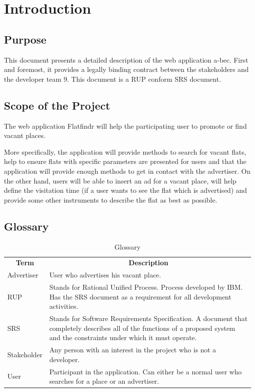 \section{Introduction}

\subsection{Purpose}
This document presents a detailed description of the web application a-bec.
First and foremost, it provides a legally binding contract between the
stakeholders and the developer team 9. This document is a RUP conform SRS document.

\subsection{Scope of the Project}
The web application Flatfindr will help the participating user to promote or
find vacant places.

More specifically, the application will provide methods to search for vacant
flats, help to ensure flats with specific parameters are presented for users and
that the application will provide enough methods to get in contact with the
advertiser. On the other hand, users will be able to insert an ad for a vacant
place, will help define the visitation time (if a user wants to
see the flat which is advertised) and provide some other instruments to describe
the flat as best as possible.

\subsection{Glossary}

\begin{table}[H]
	\centering
	\begin{tabular}{p{3cm}p{9cm}}
	\multicolumn{1}{c}{\textbf{Term}} & \multicolumn{1}{c}{\textbf{Description}} \\
Advertiser & User who advertises his vacant place. \\
RUP & Stands for Rational Unified Process. Process developed by IBM. Has the SRS document as a requirement for all development activities. \\
SRS & Stands for Software Requirements Specification. A document that completely describes all of the functions of a proposed system and the constraints under which it must operate. \\
Stakeholder & Any person with an interest in the project who is not a developer. \\
User & Participant in the application. Can either be a normal user who searches
for a place or an advertiser.
	\end{tabular}
	\caption{Glossary}
	\label{table-glossary}
\end{table}

